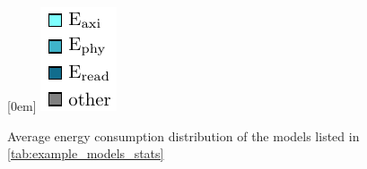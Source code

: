 \begin{figure}[hbtp]
    \centering
    \hfill
    \subcaptionbox*{}[0em]{
        \includegraphics{assets/legend.pdf}
    }
    \hfill
    \caption{Average energy consumption distribution of the models listed in \cref{tab:example_models_stats}}
    \label{fig:example_models_avg_conf_proc}
\end{figure}
    
